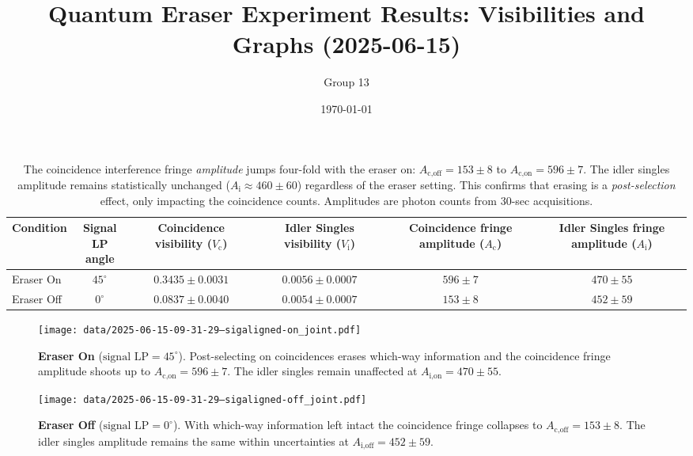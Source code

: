 \documentclass{article}
\title{Quantum Eraser Experiment Results: Visibilities and Graphs (2025-06-15)}
\author{Group 13} %
\date{\today}
\begin{document}
\pagestyle{empty} %

\begin{table*}[t]
\centering
\begin{tabular}{lccccc}
\toprule
Condition & \makecell{Signal \\ LP angle} & \makecell{Coincidence \\ visibility ($V_{\text{c}}$)} & \makecell{Idler Singles \\ visibility ($V_{\text{i}}$)} & \makecell{Coincidence fringe \\ amplitude ($A_{\text{c}}$)} & \makecell{Idler Singles \\ fringe amplitude \\ ($A_{\text{i}}$)} \\
\midrule
Eraser On   & $45^\circ$ & $0.3435 \pm 0.0031$ & $0.0056 \pm 0.0007$ & $596 \pm 7$ & $470 \pm 55$ \\
Eraser Off  & $0^\circ$  & $0.0837 \pm 0.0040$ & $0.0054 \pm 0.0007$ & $153 \pm 8$ & $452 \pm 59$ \\
\bottomrule
\end{tabular}
\caption*{
  The coincidence interference fringe \emph{amplitude}
  jumps four-fold with the eraser on: 
   $A_{\text{c,off}} = 153 \pm 8$ to
  $A_{\text{c,on}} = 596 \pm 7$. 
  The idler singles amplitude remains statistically unchanged 
  ($A_{\text{i}} \approx 460 \pm 60$) regardless of the eraser setting. 
  This confirms that erasing is a \emph{post-selection} effect,
  only impacting
  the coincidence counts.
  Amplitudes are photon counts from 30-sec acquisitions.
}
\end{table*}

\begin{figure}[h!]
\centering
\texttt{[image: data/2025-06-15-09-31-29--sigaligned-on\_joint.pdf]}
\caption*{
  \textbf{Eraser On} ($\text{signal LP}=45^\circ$).  Post-selecting on coincidences
  erases which-way information and the coincidence fringe amplitude shoots up to
  $A_{\text{c,on}} = 596 \pm 7$.
  The idler singles remain unaffected at
  $A_{\text{i,on}} = 470 \pm 55$.
}
\end{figure}

\begin{figure}[h!]
\centering
\texttt{[image: data/2025-06-15-09-31-29--sigaligned-off\_joint.pdf]}
\caption*{
  \textbf{Eraser Off} ($\text{signal LP}=0^\circ$).  With which-way information left
  intact the coincidence fringe collapses to
  $A_{\text{c,off}} = 153 \pm 8$.
  The idler singles amplitude remains the same within uncertainties at
  $A_{\text{i,off}} = 452 \pm 59$.
}
\end{figure}
\end{document}
